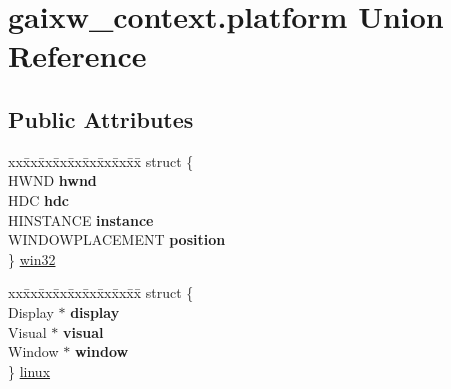 \hypertarget{uniongaixw__context_8platform}{}\section{gaixw\+\_\+context.\+platform Union Reference}
\label{uniongaixw__context_8platform}
\subsection*{Public Attributes}
\begin{DoxyCompactItemize}
\item 
\begin{tabbing}
xx\=xx\=xx\=xx\=xx\=xx\=xx\=xx\=xx\=\kill
struct \{\\
\mbox{\label{structgaixw__context_1_1_0D5_1_1_0D7_a1518b0714218c6a87198b90311b6d053}} 
HWND {\bfseries hwnd}\\
\mbox{\label{structgaixw__context_1_1_0D5_1_1_0D7_a91735d8b2b9572fbfb61d4b12b92ac75}} 
HDC {\bfseries hdc}\\
\mbox{\label{structgaixw__context_1_1_0D5_1_1_0D7_a6535b73174816280ddab85485bc22c28}} 
HINSTANCE {\bfseries instance}\\
\mbox{\label{structgaixw__context_1_1_0D5_1_1_0D7_abba6bf8f2631ee747247a93effc28371}} 
WINDOWPLACEMENT {\bfseries position}\\
\} \hyperlink{uniongaixw__context_8platform_a9c4f88f706dedde3bc0ebb66e34963e5}{win32}\\

\end{tabbing}\item 
\begin{tabbing}
xx\=xx\=xx\=xx\=xx\=xx\=xx\=xx\=xx\=\kill
struct \{\\
\mbox{\label{structgaixw__context_1_1_0D5_1_1_0D8_a9b10b2f62ae64ceaa64ca3b35b5f5d9c}} 
Display $\ast$ {\bfseries display}\\
\mbox{\label{structgaixw__context_1_1_0D5_1_1_0D8_ae4df73e7f26ed1199bb9d589e498eb81}} 
Visual $\ast$ {\bfseries visual}\\
\mbox{\label{structgaixw__context_1_1_0D5_1_1_0D8_a49e27a47eae7d22a7c48cc37e4515de0}} 
Window $\ast$ {\bfseries window}\\
\} \hyperlink{uniongaixw__context_8platform_ae206a54e97690cce50cc872dd70ee896}{linux}\\

\end{tabbing}\end{DoxyCompactItemize}


